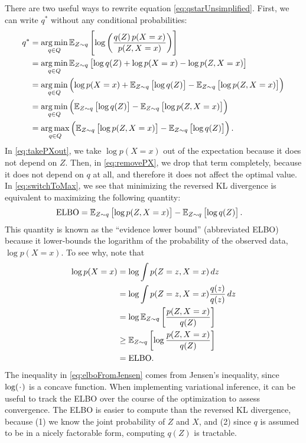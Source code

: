 \documentclass[11pt]{article}
\newcommand*{\placeholder}{\makebox[1ex]{$\cdot$}}
\begin{document}
There are two useful ways to rewrite equation \eqref{eq:qstarUnsimplified}.
First, we can write $q^*$ without any conditional probabilities:
\begin{align}
q^*
&= \operatorname*{arg\,min}_{q \in Q} \mathbb{E}_{\substack{Z \sim q}}\left[  \log \left( \frac{q(Z) \, p(X = x)}{p(Z, X = x)} \right)  \right] \\
&= \operatorname*{arg\,min}_{q \in Q} \mathbb{E}_{\substack{Z \sim q}}\left[  \log q(Z) + \log p(X = x) - \log p(Z, X = x)  \right] \\
\label{eq:takePXout}
&= \operatorname*{arg\,min}_{q \in Q} \left(
    \log p(X = x) + \mathbb{E}_{\substack{Z \sim q}}\left[  \log q(Z)  \right] - \mathbb{E}_{\substack{Z \sim q}}\left[  \log p(Z, X = x)  \right]
    \right) \\
\label{eq:removePX}
&= \operatorname*{arg\,min}_{q \in Q} \left(
    \mathbb{E}_{\substack{Z \sim q}}\left[  \log q(Z)  \right] - \mathbb{E}_{\substack{Z \sim q}}\left[  \log p(Z, X = x)  \right]
    \right) \\
\label{eq:switchToMax}
&= \operatorname*{arg\,max}_{q \in Q} \left(
    \mathbb{E}_{\substack{Z \sim q}}\left[  \log p(Z, X = x)  \right] - \mathbb{E}_{\substack{Z \sim q}}\left[  \log q(Z)  \right]
\right).
\end{align}
In \eqref{eq:takePXout}, we take $\log p(X = x)$ out of the expectation because it does not depend on $Z$.
Then, in \eqref{eq:removePX}, we drop that term completely, because it does not depend on $q$ at all, and therefore it does not affect the optimal value.
In \eqref{eq:switchToMax}, we see that minimizing the reversed KL divergence is equivalent to maximizing the following quantity:
\begin{align}
\mathrm{ELBO}
&= \mathbb{E}_{\substack{Z \sim q}}\left[  \log p(Z, X = x)  \right] - \mathbb{E}_{\substack{Z \sim q}}\left[  \log q(Z)  \right].
\end{align}
This quantity is known as the ``evidence lower bound'' (abbreviated ELBO) because it lower-bounds the logarithm of the probability of the observed data, $\log p(X = x)$.
To see why, note that
\begin{align}
\log p(X = x)
&= \log \int p(Z = z, X = x) \, dz \\
&= \log \int p(Z = z, X = x) \frac{q(z)}{q(z)} \, dz \\
&= \log \mathbb{E}_{\substack{Z \sim q}}\left[  \frac{p(Z, X=x)}{q(Z)}  \right] \\
\label{eq:elboFromJensen}
&\geq \mathbb{E}_{\substack{Z \sim q}}\left[  \log \frac{p(Z, X=x)}{q(Z)}  \right] \\
&= \mathrm{ELBO}.
\end{align}
The inequality in \eqref{eq:elboFromJensen} comes from Jensen's inequality, since $\log(\placeholder)$ is a concave function.
When implementing variational inference, it can be useful to track the ELBO over the course of the optimization to assess convergence.
The ELBO is easier to compute than the reversed KL divergence, because (1) we know the joint probability of $Z$ and $X$, and (2) since $q$ is assumed to be in a nicely factorable form, computing $q(Z)$ is tractable.
\end{document}
